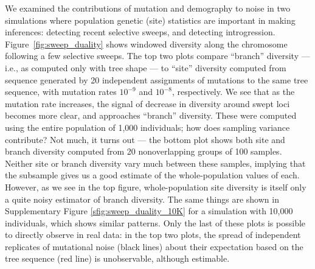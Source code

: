 \documentclass{article}
\begin{document}

We examined the contributions of mutation and demography to noise
in two simulations where population genetic (site) statistics
are important in making inferences:
detecting recent selective sweeps,
and detecting introgression.
Figure~\ref{fig:sweep_duality} shows windowed
diversity along the chromosome following a few selective sweeps.
The top two plots compare ``branch'' diversity --- i.e., as computed only with tree shape ---
to ``site'' diversity computed from sequence generated by 20 independent assignments of mutations to the same tree sequence,
with mutation rates $10^{-9}$ and $10^{-8}$, respectively.
We see that as the mutation rate increases, the signal of decrease in diversity around swept loci becomes more clear,
and approaches ``branch'' diversity.
These were computed using the entire population of 1,000 individuals;
how does sampling variance contribute?
Not much, it turns out --- the bottom plot shows both site and branch diversity
computed from 20 nonoverlapping groups of 100 samples.
Neither site or branch diversity vary much between these samples,
implying that the subsample gives us a good estimate of the whole-population values of each.
However, as we see in the top figure,
whole-population site diversity is itself only a quite noisy estimator of branch diversity.
The same things are shown in Supplementary Figure \ref{sfig:sweep_duality_10K}
for a simulation with 10,000 individuals, which shows similar patterns.
Only the last of these plots is possible to directly observe in real data:
in the top two plots,
the spread of independent replicates of mutational noise (black lines)
about their expectation based on the tree sequence (red line)
is unobservable, although estimable.
\end{document}
